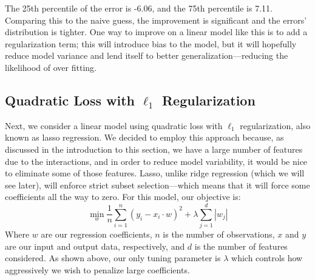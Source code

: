 \documentclass[letterpaper, 10 pt, conference]{ieeeconf}  %
\begin{document}
The 25th percentile of the error is -6.06, and the 75th percentile is 7.11. Comparing this to the naive guess, the improvement is significant and the errors' distribution is tighter. One way to improve on a linear model like this is to add a regularization term; this will introduce bias to the model, but it will hopefully reduce model variance and lend itself to better generalization---reducing the likelihood of over fitting.

\subsection{Quadratic Loss with $\ell_1$ Regularization}
Next, we consider a linear model using quadratic loss with $\ell_1$ regularization, also known as lasso regression. We decided to employ this approach because, as discussed in the introduction to this section, we have a large number of features due to the interactions, and in order to reduce model variability, it would be nice to eliminate some of those features. Lasso, unlike ridge regression (which we will see later), will enforce strict subset selection---which means that it will force some coefficients all the way to zero. For this model, our objective is:
\[
	\min_w \frac{1}{n}\sum_{i=1}^n (y_i - x_i\cdot w)^2 + \lambda \sum_{j=1}^d |w_j|
\]
Where $w$ are our regression coefficients, $n$ is the number of observations, $x$ and $y$ are our input and output data, respectively, and $d$ is the number of features considered. As shown above, our only tuning parameter is $\lambda$ which controls how aggressively we wish to penalize large coefficients. 
\end{document}
